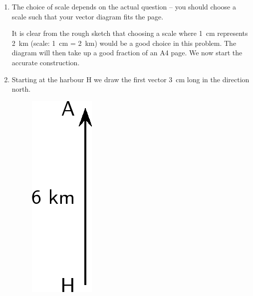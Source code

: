 {\begin{mdframed}[linewidth=4, leftmargin=40, rightmargin=40]
\begin{exercise}
\begin{enumerate}[noitemsep, label=\textbf{Step} \textbf{\arabic*}. ]
\begin{figure}[H]
\begin{center}
      \vspace{2pt}
    \vspace{.1in}
    
    \end{center}

 \end{figure}   

    \addtocounter{footnote}{-0}
    
          \par 
          \item  
          \label{m38815*id189438}The choice of scale depends on the actual question -- you should choose a
scale such that your vector diagram fits the page.\par 
          \label{m38815*id189443}It is clear from the rough sketch that choosing a scale where 1~cm represents 2~km (scale: 1~cm = 2~km) would be a good choice in this
problem. The diagram will then take up a good fraction of an A4 page. We now start the accurate construction.\par 
          \item  
          \label{m38815*id189458}Starting at the harbour H we draw the first vector 3~cm long in the direction north.\par 
          \label{m38815*id189462}
            
    \setcounter{subfigure}{0}


	\begin{figure}[H] %
    \begin{center}
    \label{m38815*id189466!!!underscore!!!media}\label{m38815*id189466!!!underscore!!!printimage}\includegraphics{col11305.imgs/m38815_PG11C1_041.png} %
        

\end{center}
\end{figure}
\end{enumerate}
\end{exercise}
\end{mdframed}}
